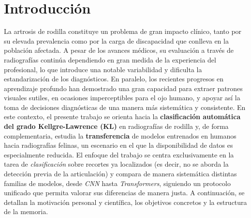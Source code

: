 \documentclass[11pt,spanish,listoffigures,listoftables]{tfgetsinf}
\begin{document}
\begin{abstract}[catalan]
	Aquest treball \textbf{demostra la viabilitat} de les \textit{CNN} i
	\textit{Transformers} com a eines de suport al diagnòstic de l'artrosi de
	genoll, \textbf{valida el \textit{transfer learning}} en contextos clínics i
	\textbf{obre la porta} a la seua aplicació en l'àmbit veterinari. Persistixen
	reptes com el \textbf{desbalanceig de classes}, l'\textbf{ambigüitat en graus
		lleus}, la \textbf{mida reduïda de mostres} i la \textbf{calibració} dels
	models.

\end{abstract}

\mainmatter

\chapter{Introducción}
La artrosis de rodilla constituye un problema de gran impacto clínico, tanto por
su elevada prevalencia como por la carga de discapacidad que conlleva en la
población afectada. A pesar de los avances médicos, su evaluación a través de
radiografías continúa dependiendo en gran medida de la experiencia del
profesional, lo que introduce una notable variabilidad y dificulta la
estandarización de los diagnósticos. En paralelo, los recientes progresos en
aprendizaje profundo han demostrado una gran capacidad para extraer patrones
visuales sutiles, en ocasiones imperceptibles para el ojo humano, y apoyar así
la toma de decisiones diagnósticas de una manera más sistemática y consistente.
En este contexto, el presente trabajo se orienta hacia la
\textbf{clasificación automática del grado Kellgre-Lawrence (KL)} en
radiografías de rodilla y, de forma complementaria, estudia la
\textbf{transferencia} de modelos entrenados en humanos hacia radiografías
felinas, un escenario en el que la disponibilidad de datos es especialmente
reducida. El enfoque del trabajo se centra exclusivamente en la tarea de
\textit{clasificación} sobre recortes ya localizados (es decir, no se aborda la
detección previa de la articulación) y compara de manera sistemática distintas
familias de modelos, desde \emph{CNN} hasta \emph{Transformers}, siguiendo un
protocolo unificado que permita valorar sus diferencias de manera justa. A
continuación, se detallan la motivación personal y científica, los objetivos
concretos y la estructura de la memoria.
\end{document}
